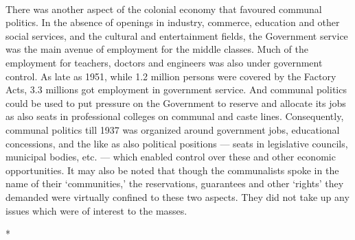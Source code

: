 \begin{multicols}{2}
\paragraph*{}
There was another aspect of the colonial economy that favoured communal politics. In the absence of openings in industry, commerce, education and other social services, and the cultural and entertainment fields, the Government service was the main avenue of employment for the middle classes. Much of the employment for teachers, doctors and engineers was also under government control. As late as 1951, while 1.2 million persons were covered by the Factory Acts, 3.3 millions got employment in government service. And communal politics could be used to put pressure on the Government to reserve and allocate its jobs as also seats in professional colleges on communal and caste lines. Consequently, communal politics till 1937 was organized around government jobs, educational concessions, and the like as also political positions --- seats in legislative councils, municipal bodies, etc. --- which enabled control over these and other economic opportunities. It may also be noted that though the communalists spoke in the name of their `communities,' the reservations, guarantees and other `rights' they demanded were virtually confined to these two aspects. They did not take up any issues which were of interest to the masses.

\begin{center}*\end{center}


\end{multicols}
